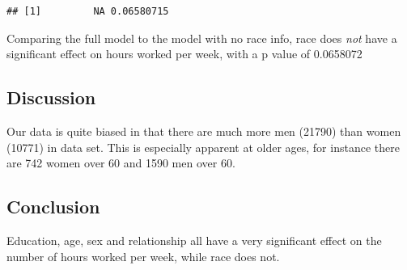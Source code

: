 \documentclass[]{article}
\newenvironment{Shaded}{\begin{snugshade}}{\end{snugshade}}
\newcommand{\KeywordTok}[1]{\textcolor[rgb]{0.13,0.29,0.53}{\textbf{#1}}}
\newcommand{\NormalTok}[1]{#1}
\newcommand{\OperatorTok}[1]{\textcolor[rgb]{0.81,0.36,0.00}{\textbf{#1}}}
\begin{document}
\begin{Shaded}
\end{Shaded}

\begin{verbatim}
## [1]         NA 0.06580715
\end{verbatim}

Comparing the full model to the model with no race info, race does
\emph{not} have a significant effect on hours worked per week, with a p
value of 0.0658072

\hypertarget{discussion}{%
\subsection{Discussion}\label{discussion}}

Our data is quite biased in that there are much more men (21790) than
women (10771) in data set. This is especially apparent at older ages,
for instance there are 742 women over 60 and 1590 men over 60.

\hypertarget{conclusion}{%
\subsection{Conclusion}\label{conclusion}}

Education, age, sex and relationship all have a very significant effect
on the number of hours worked per week, while race does not.
\end{document}
